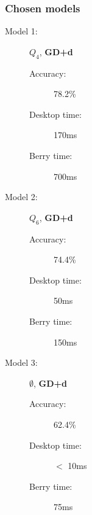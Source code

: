 \documentclass{beamer}
\begin{document}
\begin{frame}
  \frametitle{Chosen models}

  \begin{description}
    \item[Model 1:] $Q_4$, \textbf{GD+d}
      \begin{description}
        \item[Accuracy:] 78.2\%
        \item[Desktop time:] 170ms
        \item[Berry time:] 700ms
      \end{description}
    \item[Model 2:] $Q_6$, \textbf{GD+d}
      \begin{description}
        \item[Accuracy:] 74.4\%
        \item[Desktop time:] 50ms
        \item[Berry time:] 150ms
      \end{description}
    \item[Model 3:] $\emptyset$, \textbf{GD+d}
      \begin{description}
        \item[Accuracy:] 62.4\%
        \item[Desktop time:] $<$ 10ms
        \item[Berry time:] 75ms
      \end{description}
  \end{description}
\end{frame}
\end{document}
